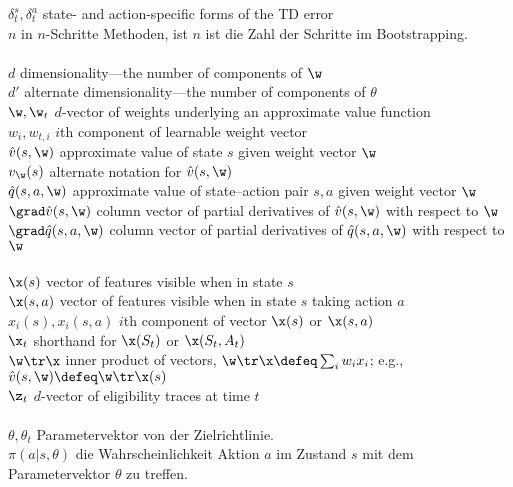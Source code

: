 \documentclass[a4paper,titlepage]{article}
\numberwithin{equation}{section} %
\begin{document}
\>$\delta^s_t, \delta^a_t$ \> state- and action-specific forms of the TD error \\
\>$n$                 \> in $n$-Schritte Methoden, ist $n$ ist die Zahl der Schritte im Bootstrapping.\\
\\
\>$d$                 \> dimensionality---the number of components of $\w$\\
\>$d'$                \> alternate dimensionality---the number of components of $\theta$\\
\>$\w,\w_t$           \> $d$-vector of weights underlying an approximate value function\\
\>$w_i,w_{t,i}$ \> $i$th component of learnable weight vector\\
\>$\hat v(s,\w)$      \> approximate value of state $s$ given weight vector $\w$\\
\>$v_\w(s)$           \> alternate notation for $\hat v(s,\w)$\\
\>$\hat q(s,a,\w)$    \> approximate value of state--action pair $s,a$ given weight vector $\w$\\
\>$\grad \hat v(s,\w)$\> column vector of partial derivatives of $\hat v(s,\w)$ with respect to $\w$\\
\>$\grad \hat q(s,a,\w)$\> column vector of partial derivatives of $\hat q(s,a,\w)$ with respect to $\w$\\
\\
\>$\x(s)$             \> vector of features visible when in state $s$\\
\>$\x(s,a)$           \> vector of features visible when in state $s$ taking action $a$\\
\>$x_i(s), x_i(s,a)$  \> $i$th component of vector $\x(s)$ or $\x(s, a)$\\
\>$\x_t$              \> shorthand for $\x(S_t)$ or $\x(S_t,A_t)$\\
\>$\w\tr\x$           \> inner product of vectors, $\w\tr\x\defeq\sum_i w_i x_i$; e.g., $\hat v(s,\w)\defeq\w\tr\x(s)$\\
\>$\z_t$              \> $d$-vector of eligibility traces at time $t$ \\
\\
\>$\theta, \theta_t$        \> Parametervektor von der Zielrichtlinie. \\
\>$\pi(a|s,\theta)$      \> die Wahrscheinlichkeit Aktion $a$ im Zustand $s$ mit dem Parametervektor $\theta$ zu treffen.\\
\end{document}
